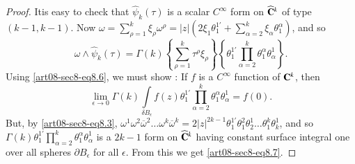 \begin{proof}
It\pageoriginale is easy to check that $\widehat{\psi}_{k}(\tau)$ is a scalar $C^{\infty}$ form on $\widehat{\mathbf{C}}^{k}$ of type $(k-1,k-1)$. Now $\omega=\sum\limits^{k}_{\rho=1}\xi_{\rho}\omega^{\rho}=|z|(2\xi_{1}\theta^{1'}_{1}+\sum\limits^{k}_{\alpha=2}\xi_{\alpha}\theta^{\alpha}_{1})$, and so
\begin{equation}
\omega\wedge \widehat{\psi}_{k}(\tau)=\Gamma(k)\left\{\sum\limits^{k}_{\rho=1}\tau^{\rho}\xi_{\rho}\right\}\left\{\theta^{1'}_{1}\prod\limits^{k}_{\alpha=2}\theta^{\alpha}_{1}\theta^{1}_{\alpha}\right\}.\label{art08-sec8-eq8.6}
\end{equation}
Using \eqref{art08-sec8-eq8.6}, we must show : If $f$ is a $C^{\infty}$ function of $\mathbf{C}^{k}$, then
\begin{equation}
\lim\limits_{\epsilon\to 0}\Gamma(k)\int\limits_{\delta B_{\epsilon}}f(z)\theta^{1'}_{1}\prod\limits^{k}_{\alpha=2}\theta^{\alpha}_{1}\theta^{1}_{\alpha}=f(0).\label{art08-sec8-eq8.7}
\end{equation}
But, by \eqref{art08-sec8-eq8.3}, $\omega^{1}\omega^{2}\overline{\omega}^{2}\ldots\omega^{k}\overline{\omega}^{k}=2|z|^{2k-1}\theta^{1'}_{1}\theta^{2}_{1}\theta^{1}_{2}\ldots\theta^{k}_{1}\theta^{1}_{k}$, and so\break $\Gamma(k)\theta^{1'}_{1}\prod\limits^{k}_{\alpha=2}\theta^{\alpha}_{1}\theta^{1}_{\alpha}$ is a $2k-1$ form on $\widehat{\mathbf{C}}^{k}$ having constant surface integral one over all spheres $\partial B_{\epsilon}$ for all $\epsilon$. From this we get \eqref{art08-sec8-eq8.7}.
\end{proof}


